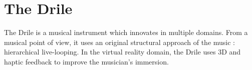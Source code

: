 \section{The Drile}
The Drile is a musical instrument which innovates in multiple domains.
From a musical point of view, it uses an original structural approach of the music : hierarchical live-looping.
In the virtual reality domain, the Drile uses 3D and haptic feedback to improve the musician's immersion.







